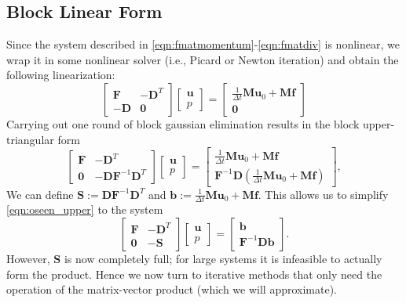 \documentclass{article}
\newcommand{\mat}[1]{\bm{{#1}}}
\renewcommand{\vec}[1]{\bm{{#1}}}
\begin{document}
\subsection{Block Linear Form}
Since the system described in \eqref{eqn:fmatmomentum}-\eqref{eqn:fmatdiv} is nonlinear, we wrap it in some nonlinear solver (i.e., Picard or Newton iteration) and obtain the following linearization:
\begin{equation}
  \begin{bmatrix}
    \mat{F} & -\mat{D}^T \\
    -\mat{D} & \mat{0}
  \end{bmatrix}
  \begin{bmatrix}
    \vec{u} \\ p
  \end{bmatrix}
  =
  \begin{bmatrix}
    \frac{1}{\Delta t}\mat{M}\vec{u}_0 + \mat{M}\vec{f} \\ \mat{0}
  \end{bmatrix}
\end{equation}
Carrying out one round of block gaussian elimination results in the block upper-triangular form
\begin{equation}
  \begin{bmatrix}
    \mat{F} & -\mat{D}^T \\
    \mat{0} & -\mat{D}\mat{F}^{-1}\mat{D}^T
  \end{bmatrix}
  \begin{bmatrix}
    \vec{u} \\ p
  \end{bmatrix}
  =
  \begin{bmatrix}
    \frac{1}{\Delta t}\mat{M}\vec{u}_0 + \mat{M}\vec{f} \\ \mat{F}^{-1}\mat{D}\left( \frac{1}{\Delta t}\mat{M}\vec{u}_0 + \mat{M}\vec{f}\right)
  \end{bmatrix}, \label{eqn:oseen_upper}
\end{equation}
We can define $\mat{S}:=\mat{D}\mat{F}^{-1}\mat{D}^T$ and $\vec{b}:=\frac{1}{\Delta t}\mat{M}\vec{u}_0 + \mat{M}\vec{f}$.  This allows us to simplify \eqref{eqn:oseen_upper} to the system
\begin{equation}
  \begin{bmatrix}
    \mat{F} & -\mat{D}^T \\
    \mat{0} & -\mat{S}
  \end{bmatrix}
  \begin{bmatrix}
    \vec{u} \\ p
  \end{bmatrix}
  =
  \begin{bmatrix}
    \vec{b} \\ \mat{F}^{-1}\mat{D}\vec{b}
  \end{bmatrix}. \label{eqn:oseen_schur}
\end{equation}
However, $\mat{S}$ is now completely full; for large systems it is infeasible to actually form the product.  Hence we now turn to iterative methods that only need the operation of the matrix-vector product (which we will approximate).
\end{document}
